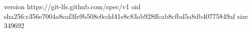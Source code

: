 version https://git-lfs.github.com/spec/v1
oid sha256:c356e7004a8eaf3fe9b508c0cdd41e8c83ab928ffcab8cfbd5a8db40775849af
size 349692
